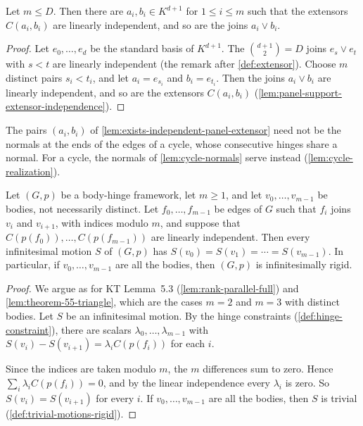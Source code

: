 \begin{lemma}
  \label{lem:exists-independent-panel-extensor}
  \leanok
  Let $m \le D$. Then there are $a_i, b_i \in K^{d+1}$ for
  $1 \le i \le m$ such that the extensors $C(a_i, b_i)$ are linearly
  independent, and so are the joins $a_i \vee b_i$.
\end{lemma}
\begin{proof}
  \leanok
  Let $e_0, \dots, e_d$ be the standard basis of $K^{d+1}$. The
  $\binom{d+1}{2} = D$ joins $e_s \vee e_t$ with $s < t$ are linearly
  independent (the remark after \cref{def:extensor}). Choose $m$ distinct
  pairs $s_i < t_i$, and let $a_i = e_{s_i}$ and $b_i = e_{t_i}$. Then
  the joins $a_i \vee b_i$ are linearly independent, and so are the
  extensors $C(a_i, b_i)$ (\cref{lem:panel-support-extensor-independence}).
\end{proof}

The pairs $(a_i, b_i)$ of \cref{lem:exists-independent-panel-extensor}
need not be the normals at the ends of the edges of a cycle, whose
consecutive hinges share a normal. For a cycle, the normals of
\cref{lem:cycle-normals} serve instead (\cref{lem:cycle-realization}).

\begin{lemma}
  \label{lem:cycle-realization-rigid}
  \leanok
  Let $(G,p)$ be a body-hinge framework, let $m \ge 1$, and let
  $v_0, \dots, v_{m-1}$ be bodies, not necessarily distinct. Let
  $f_0, \dots, f_{m-1}$ be edges of $G$ such that $f_i$ joins $v_i$ and
  $v_{i+1}$, with indices modulo $m$, and suppose that
  $C(p(f_0)), \dots, C(p(f_{m-1}))$ are linearly independent. Then every
  infinitesimal motion $S$ of $(G,p)$ has
  $S(v_0) = S(v_1) = \cdots = S(v_{m-1})$. In particular, if
  $v_0, \dots, v_{m-1}$ are all the bodies, then $(G,p)$ is
  infinitesimally rigid.
\end{lemma}
\begin{proof}
  \leanok
  We argue as for KT Lemma~5.3 (\cref{lem:rank-parallel-full}) and
  \cref{lem:theorem-55-triangle}, which are the cases $m = 2$ and $m = 3$
  with distinct bodies. Let $S$ be an infinitesimal motion. By the hinge
  constraints (\cref{def:hinge-constraint}), there are scalars
  $\lambda_0, \dots, \lambda_{m-1}$ with
  $S(v_i) - S(v_{i+1}) = \lambda_i C(p(f_i))$ for each $i$.

  Since the indices are taken modulo $m$, the $m$ differences sum to
  zero. Hence $\sum_i \lambda_i C(p(f_i)) = 0$, and by the linear
  independence every $\lambda_i$ is zero. So $S(v_i) = S(v_{i+1})$ for
  every $i$. If $v_0, \dots, v_{m-1}$ are all the bodies, then $S$ is
  trivial (\cref{def:trivial-motions-rigid}).
\end{proof}

